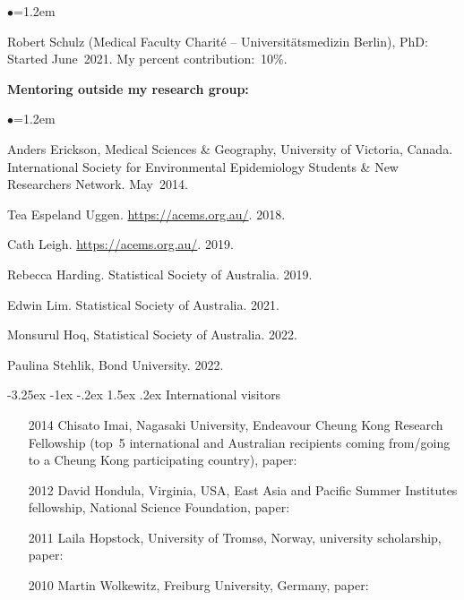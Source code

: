 \documentclass[a4paper,11pt]{article}
\makeatletter
\renewcommand\subsection{\@startsection{subsection}{2}{\z@}%
                                       {-3.25ex \@plus -1ex \@minus -.2ex}%
                                       {1.5ex \@plus .2ex}%
                                   {\normalfont\normalsize\bfseries\color{blue}}}
\renewcommand{\labelitemi}{$\bullet$}
\makeatother
\begin{document}
\begin{raggedright}
\begin{list}{\labelitemi}{\leftmargin=1.2em}

% 
\item Robert Schulz (Medical Faculty Charit\'{e} – Universit\"{a}tsmedizin Berlin), PhD: Started June~2021. My percent contribution:~10\%.
\end{list}

\textbf{Mentoring outside my research group:}

\begin{list}{\labelitemi}{\leftmargin=1.2em}\addtolength{\itemsep}{-0.5\baselineskip}
\item Anders Erickson, Medical Sciences \& Geography, University of Victoria, Canada. International Society for Environmental Epidemiology Students \& New Researchers Network. May~2014.
\item Tea Espeland Uggen. \href{ACEMS}{https://acems.org.au/}. 2018.
\item Cath Leigh. \href{ACEMS}{https://acems.org.au/}. 2019.
\item Rebecca Harding. Statistical Society of Australia. 2019.
\item Edwin Lim. Statistical Society of Australia. 2021.
\item Monsurul Hoq, Statistical Society of Australia. 2022.
\item Paulina Stehlik, Bond University. 2022.
\end{list}

\subsection{International visitors}

\begin{itemize}%
  \item[2014] Chisato Imai, Nagasaki University, Endeavour Cheung Kong Research Fellowship (top~5 international and Australian recipients coming from/going to a Cheung Kong participating country), paper: 
  \item[2012] David Hondula, Virginia, USA, East Asia and Pacific Summer Institutes fellowship, National Science Foundation, paper: 
  \item[2011] Laila Hopstock, University of {T}roms{\o}, Norway, university scholarship, paper: 
  \item[2010] Martin Wolkewitz, Freiburg University, Germany, paper: 
\end{itemize}


\end{raggedright}
\end{document}
